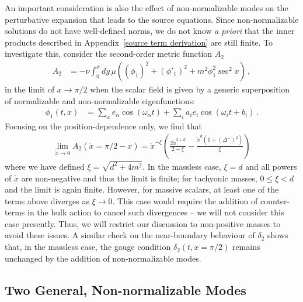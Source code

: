 \documentclass[letterpaper,11pt]{article}
\begin{document}
An important consideration is also the effect of non-normalizable modes on the perturbative expansion that leads to the source equations. Since non-normalizable solutions do not have well-defined norms, we do not know \emph{a priori} that the inner products described in Appendix~\ref{source term derivation} are still finite. To investigate this, consider the second-order metric function $A_2$
\begin{align}
A_2 &= - \nu \int^x_0 dy \, \mu \left( (\dot \phi_1)^2 + (\phi'_1)^2 + m^2 \phi_1^2 \sec^2 x \right) \, ,
\end{align}
in the limit of $x \to \pi/2$ when the scalar field is given by a generic superposition of normalizable and non-normalizable eigenfunctions:
\begin{align}
\phi_1 (t, x) &= \sum_\alpha e_\alpha \cos (\omega_\alpha t ) + \sum_i a_i e_i \cos (\omega_i t + b_i) \, .
\end{align}
Focusing on the position-dependence only, we find that
\begin{align}
\lim_{\tilde x \to 0} A_2 (\tilde x = \pi /2 - x) = \tilde{x}^{-\xi} \left( \frac{2 \tilde{x}^{2+d}}{2 - \xi} - \frac{\tilde{x}^d (1 + \left(\Delta^{-}\right)^2)}{\xi} \right)
\end{align}
where we have defined $\xi = \sqrt{d^2 + 4m^2}$. In the massless case, $\xi = d$ and all powers of $\tilde{x}$ are non-negative and thus the limit is finite; for tachyonic masses, $0 \leq \xi < d$ and the limit is again finite. However, for massive scalars, at least one of the terms above diverges as $\xi \to 0$. This case would require the addition of counter-terms in the bulk action to cancel such divergences -- we will not consider this case presently. Thus, we will restrict our discussion to non-positive masses to avoid these issues. A similar check on the near-boundary behaviour of $\delta_2$ shows that, in the massless case, the gauge condition $\delta_2 (t, x=\pi/2)$ remains unchanged by the addition of non-normalizable modes.

\subsection{Two General, Non-normalizable Modes}
\end{document}
